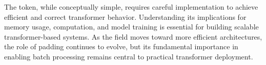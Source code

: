The \pad{} token, while conceptually simple, requires careful implementation to achieve efficient and correct transformer behavior. Understanding its implications for memory usage, computation, and model training is essential for building scalable transformer-based systems. As the field moves toward more efficient architectures, the role of padding continues to evolve, but its fundamental importance in enabling batch processing remains central to practical transformer deployment.